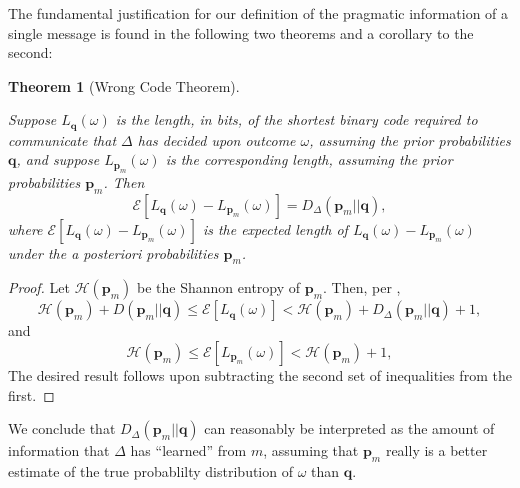 \documentclass[11pt]{article}
\newtheorem{theorem}{Theorem}[subsection]
\begin{document}
The fundamental justification for our definition of the pragmatic information of a single message is found in the following two theorems and a corollary to the second:
\begin{theorem}[Wrong Code Theorem]\label{WrongCode}

Suppose $L_{\mathbf q}(\omega)$ is the length, in bits, of the shortest binary code required to communicate that $\Delta$ has decided upon outcome $\omega$, assuming the prior probabilities $\mathbf q$, and suppose $L_{\mathbf p_m}(\omega)$ is the corresponding length, assuming the prior probabilities $\mathbf p_m$.  Then 
$$
{\mathcal E}\left[L_{\mathbf q}(\omega) -  L_{\mathbf p_m}(\omega)\right]  = D_\Delta(\mathbf p_m || \mathbf q),
$$
where ${\mathcal E}\left[L_{\mathbf q}(\omega) -  L_{\mathbf p_m}(\omega)\right] $ is  the expected length of  
$L_{\mathbf q}(\omega) -  L_{\mathbf p_m}(\omega)$ under the {\rm a posteriori} probabilities $\mathbf p_m$. 
\end{theorem}
\begin{proof}
Let ${\mathcal  H}(\mathbf p_m)$ be the Shannon entropy of  $\mathbf p_m$.  Then, per \cite{CoverAndThomas},
$$
{\mathcal H}(\mathbf p_m) + D(\mathbf p_m || \mathbf q) \leq {\mathcal E}\left[L_{\mathbf q}(\omega)\right]< {\mathcal H}(\mathbf p_m) + D_\Delta(\mathbf p_m || \mathbf q) + 1,
$$
and
$$
{\mathcal H}(\mathbf p_m) \leq {\mathcal E}\left[L_{\mathbf p_m}(\omega)\right] <{\mathcal H}(\mathbf p_m) + 1,
$$ 
The desired result follows upon subtracting the second set of inequalities from the first.
\end{proof}
We conclude that $D_\Delta(\mathbf p_m || \mathbf q)$ can reasonably be interpreted as the amount of information that $\Delta$ has ``learned'' from $m$, assuming that 
$\mathbf p_m$ really is a better estimate of the true probablilty distribution of $\omega$ than $\mathbf q$.\\
\end{document}
